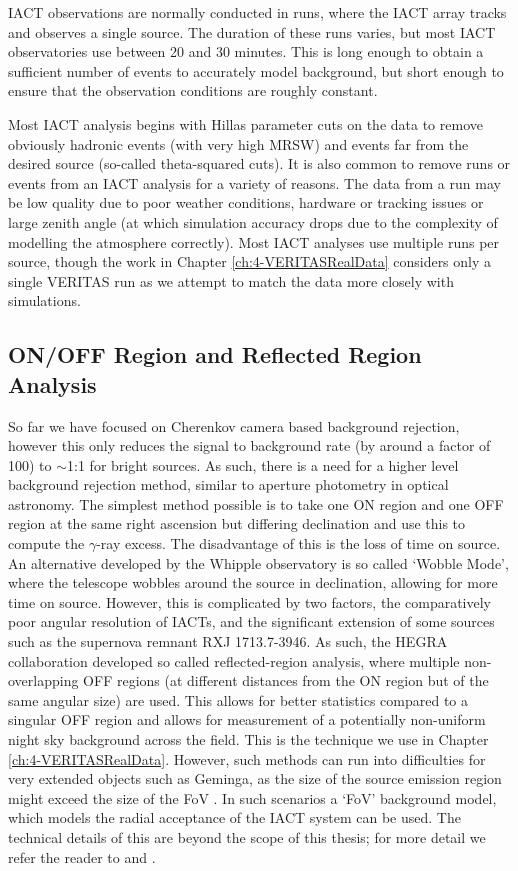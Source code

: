 IACT observations are normally conducted in runs, where the IACT array tracks and observes a single source. The duration of these runs varies, but most IACT observatories use between 20 and 30 minutes. This is long enough to obtain a sufficient number of events to accurately model background, but short enough to ensure that the observation conditions are roughly constant.

Most IACT analysis begins with Hillas parameter cuts on the data to remove obviously hadronic events (with very high MRSW) and events far from the desired source (so-called theta-squared cuts). It is also common to remove runs or events from an IACT analysis for a variety of reasons. The data from a run may be low quality due to poor weather conditions, hardware or tracking issues or large zenith angle (at which simulation accuracy drops due to the complexity of modelling the atmosphere correctly). Most IACT analyses use multiple runs per source, though the work in Chapter \ref{ch:4-VERITASRealData} considers only a single VERITAS run as we attempt to match the data more closely with simulations.

\subsection{ON/OFF Region and Reflected Region Analysis}
So far we have focused on Cherenkov camera based background rejection, however this only reduces the signal to background rate (by around a factor of 100) to $\sim$1:1 for bright sources. As such, there is a need for a higher level background rejection method, similar to aperture photometry in optical astronomy. The simplest method possible is to take one ON region and one OFF region at the same right ascension but differing declination and use this to compute the $\gamma$-ray excess. The disadvantage of this is the loss of time on source. An alternative developed by the Whipple observatory is so called `Wobble Mode', where the telescope wobbles around the source in declination, allowing for more time on source. However, this is complicated by two factors, the comparatively poor angular resolution of IACTs, and the significant extension of some sources such as the supernova remnant RXJ 1713.7-3946. As such, the HEGRA collaboration \cite{HEGRA} developed so called reflected-region analysis, where multiple non-overlapping OFF regions (at different distances from the ON region but of the same angular size) are used. This allows for better statistics compared to a singular OFF region and allows for measurement of a potentially non-uniform night sky background across the field. This is the technique we use in Chapter \ref{ch:4-VERITASRealData}. However, such methods can run into difficulties for very extended objects such as Geminga, as the size of the source emission region might exceed the size of the FoV \cite{geminga}. In such scenarios a `FoV' background model, which models the radial acceptance of the IACT system can be used. The technical details of this are beyond the scope of this thesis; for more detail we refer the reader to \cite{Berge07} and \cite{geminga}. 

